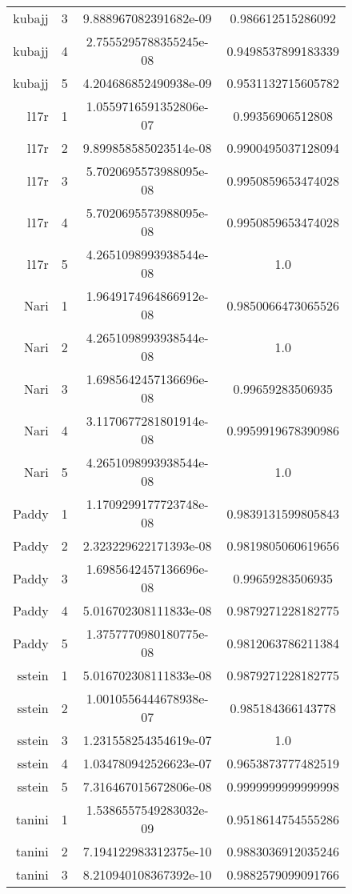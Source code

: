 \begin{figure}[h]
\begin{longtable}{r|c|c|c}
      kubajj & 3 & 9.888967082391682e-09 & 0.986612515286092  \\
      kubajj & 4 & 2.7555295788355245e-08 & 0.9498537899183339  \\
      kubajj & 5 & 4.204686852490938e-09 & 0.9531132715605782  \\
      l17r & 1 & 1.0559716591352806e-07 & 0.99356906512808  \\
      l17r & 2 & 9.899858585023514e-08 & 0.9900495037128094  \\
      l17r & 3 & 5.7020695573988095e-08 & 0.9950859653474028  \\
      l17r & 4 & 5.7020695573988095e-08 & 0.9950859653474028  \\
      l17r & 5 & 4.2651098993938544e-08 & 1.0  \\
      Nari & 1 & 1.9649174964866912e-08 & 0.9850066473065526  \\
      Nari & 2 & 4.2651098993938544e-08 & 1.0  \\
      Nari & 3 & 1.6985642457136696e-08 & 0.99659283506935  \\
      Nari & 4 & 3.1170677281801914e-08 & 0.9959919678390986  \\
      Nari & 5 & 4.2651098993938544e-08 & 1.0  \\
      Paddy & 1 & 1.1709299177723748e-08 & 0.9839131599805843  \\
      Paddy & 2 & 2.323229622171393e-08 & 0.9819805060619656  \\
      Paddy & 3 & 1.6985642457136696e-08 & 0.99659283506935  \\
      Paddy & 4 & 5.016702308111833e-08 & 0.9879271228182775  \\
      Paddy & 5 & 1.3757770980180775e-08 & 0.9812063786211384  \\
      sstein & 1 & 5.016702308111833e-08 & 0.9879271228182775  \\
      sstein & 2 & 1.0010556444678938e-07 & 0.985184366143778  \\
      sstein & 3 & 1.231558254354619e-07 & 1.0 \\
      sstein & 4 & 1.034780942526623e-07 & 0.9653873777482519  \\
      sstein & 5 & 7.316467015672806e-08 & 0.9999999999999998  \\
      tanini & 1 & 1.5386557549283032e-09 & 0.9518614754555286  \\
      tanini & 2 & 7.194122983312375e-10 & 0.9883036912035246  \\
      tanini & 3 & 8.210940108367392e-10 & 0.9882579099091766  \\

\end{longtable}
\end{figure}
